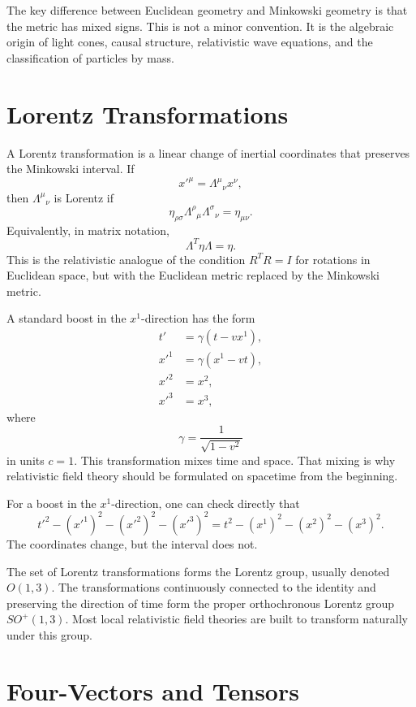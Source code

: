 The key difference between Euclidean geometry and Minkowski geometry is that
the metric has mixed signs. This is not a minor convention. It is the algebraic
origin of light cones, causal structure, relativistic wave equations, and the
classification of particles by mass.

\section{Lorentz Transformations}

A Lorentz transformation is a linear change of inertial coordinates that
preserves the Minkowski interval. If
\[
    x'^\mu = \Lambda^\mu{}_{\nu}x^\nu,
\]
then \(\Lambda^\mu{}_{\nu}\) is Lorentz if
\[
    \eta_{\rho\sigma}\Lambda^\rho{}_{\mu}\Lambda^\sigma{}_{\nu}
    = \eta_{\mu\nu}.
\]
Equivalently, in matrix notation,
\[
    \Lambda^T\eta\Lambda=\eta.
\]
This is the relativistic analogue of the condition \(R^TR=I\) for rotations in
Euclidean space, but with the Euclidean metric replaced by the Minkowski metric.

A standard boost in the \(x^1\)-direction has the form
\[
\begin{aligned}
    t' &= \gamma(t-vx^1),\\
    x'^1 &= \gamma(x^1-vt),\\
    x'^2 &= x^2,\\
    x'^3 &= x^3,
\end{aligned}
\]
where
\[
    \gamma = \frac{1}{\sqrt{1-v^2}}
\]
in units \(c=1\). This transformation mixes time and space. That mixing is why
relativistic field theory should be formulated on spacetime from the beginning.

\begin{examplebox}
For a boost in the \(x^1\)-direction, one can check directly that
\[
    t'^2-(x'^1)^2-(x'^2)^2-(x'^3)^2
    = t^2-(x^1)^2-(x^2)^2-(x^3)^2.
\]
The coordinates change, but the interval does not.
\end{examplebox}

The set of Lorentz transformations forms the Lorentz group, usually denoted
\(O(1,3)\). The transformations continuously connected to the identity and
preserving the direction of time form the proper orthochronous Lorentz group
\(SO^+(1,3)\). Most local relativistic field theories are built to transform
naturally under this group.

\section{Four-Vectors and Tensors}

